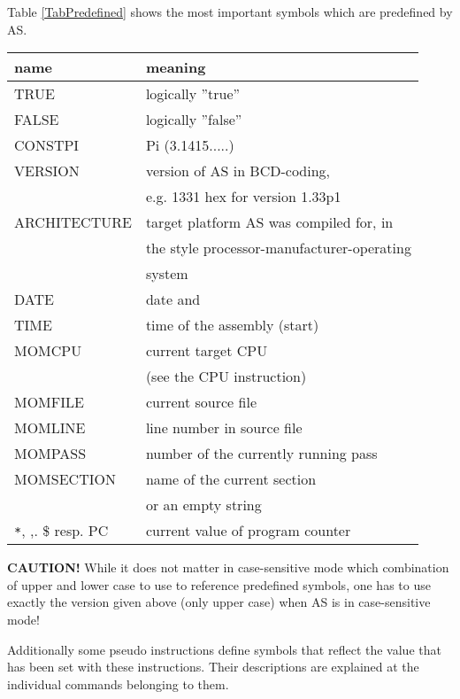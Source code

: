 \documentclass[12pt,twoside]{report}
\newcommand{\bb}[1]{{\bf #1}}
\begin{document}
Table \ref{TabPredefined} shows the most important symbols which are
predefined by AS.
\begin{table*}[htb]
\begin{center}\begin{tabular}{|l|l|}
\hline
name          & meaning \\
\hline
\hline
TRUE          & logically ''true'' \\
FALSE         & logically ''false'' \\
CONSTPI       & Pi (3.1415.....) \\
VERSION       & version of AS in BCD-coding, \\
              & e.g. 1331 hex for version 1.33p1 \\
ARCHITECTURE  & target platform AS was compiled for, in \\
              & the style processor-manufacturer-operating \\
              & system \\
DATE          & date and \\
TIME          & time of the assembly (start) \\
MOMCPU        & current target CPU \\
              & (see the CPU instruction) \\
MOMFILE       & current source file \\
MOMLINE       & line number in source file \\
MOMPASS       & number of the currently running pass \\
MOMSECTION    & name of the current section \\
              & or an empty string \\
\verb!*!, ,. \$ resp. PC & current value of program counter \\
\hline
\end{tabular}\end{center}
\caption{Predefined Symbols\label{TabPredefined}}
\end{table*}
\bb{CAUTION!}  While it does not matter in case-sensitive mode which
combination of upper and lower case to use to reference predefined
symbols, one has to use exactly the version given above (only upper
case) when AS is in case-sensitive mode!

Additionally some pseudo instructions define symbols that reflect the
value that has been set  with these instructions.  Their descriptions
are explained at the individual commands belonging to them.
\end{document}
